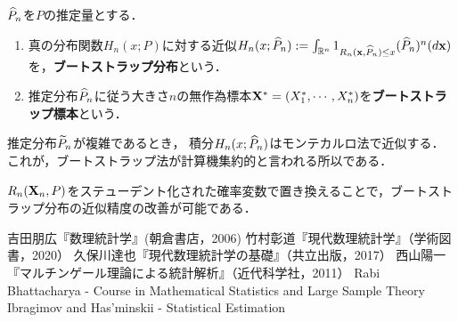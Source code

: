 \documentclass[uplatex,dvipdfmx]{jsreport}
\begin{document}
\begin{definition}
    $\widehat{P}_n$を$P$の推定量とする．
    \begin{enumerate}
        \item 真の分布関数$H_n(x;P)$に対する近似$H_n(x;\widehat{P}_n):=\int_{\mathbb{R}^n}1_{R_n(\mathbf{x},\widehat{P}_n)\le x}(\widehat{P}_n)^n(d\mathbf{x})$を，\textbf{ブートストラップ分布}という．
        \item 推定分布$\widehat{P}_n$に従う大きさ$n$の無作為標本$\mathbf{X}^*=(X^*_1,\cdots,X^*_n)$を\textbf{ブートストラップ標本}という．
    \end{enumerate}
\end{definition}
\begin{remark}
    推定分布$\widetilde{P}_n$が複雑であるとき，
    積分$H_n(x;\widehat{P}_n)$はモンテカルロ法で近似する．
    これが，ブートストラップ法が計算機集約的と言われる所以である．
\end{remark}
\begin{remark}[studentization]
    $R_n(\mathbf{X}_n,P)$をステューデント化された確率変数で置き換えることで，ブートストラップ分布の近似精度の改善が可能である．
\end{remark}

\begin{thebibliography}{99}
    吉田朋広『数理統計学』(朝倉書店，2006)
    竹村彰道『現代数理統計学』（学術図書，2020）
    久保川達也『現代数理統計学の基礎』（共立出版，2017）
    西山陽一『マルチンゲール理論による統計解析』（近代科学社，2011）
    Rabi Bhattacharya - Course in Mathematical Statistics and Large Sample Theory
    Ibragimov and Has'minskii - Statistical Estimation
\end{thebibliography}
\end{document}
